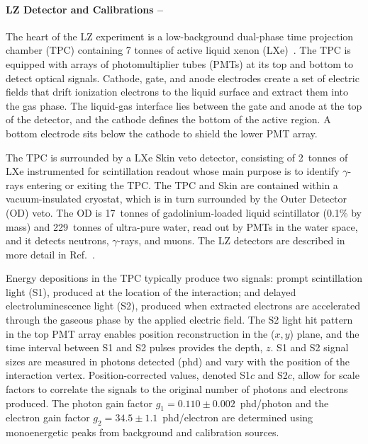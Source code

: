 \paragraph{LZ Detector and Calibrations --}
The heart of the LZ experiment is a low-background dual-phase time projection chamber (TPC) containing 7 tonnes of active liquid xenon (LXe)~\cite{LZ:Experiment_2020, LZ:TDR_2017}.
The TPC is equipped with arrays of photomultiplier tubes (PMTs) at its top and bottom to detect optical signals.
Cathode, gate, and anode electrodes create a set of electric fields that drift ionization electrons to the liquid surface and extract them into the gas phase.
The liquid-gas interface lies between the gate and anode at the top of the detector, and the cathode defines the bottom of the active region. A bottom electrode sits below the cathode to shield the lower PMT array.

The TPC  is surrounded by a LXe Skin veto detector, consisting of 2~tonnes of LXe instrumented for scintillation readout whose main purpose is to identify $\gamma$-rays  entering or exiting the TPC.
The TPC and Skin are contained within a vacuum-insulated cryostat, which is in turn surrounded by the Outer Detector (OD) veto. The OD is 17~tonnes of gadolinium-loaded liquid scintillator (0.1\% by mass) and 229~tonnes of ultra-pure water, read out by PMTs in the water space, and it detects neutrons, $\gamma$-rays, and muons.
The LZ detectors are described in more detail in Ref.~\cite{LZ:Experiment_2020}.

Energy depositions in the TPC typically produce two signals: prompt scintillation light (S1), produced at the location of the interaction; and delayed electroluminescence light (S2), produced when extracted electrons are accelerated through the gaseous phase by the applied electric field.
The S2 light hit pattern in the top PMT array enables position reconstruction in the ($x,y$) plane, and the time interval between S1 and S2 pulses provides the depth, $z$. S1 and S2 signal sizes are measured in photons detected (phd) and vary with the position of the interaction vertex. Position-corrected values, denoted S1$c$ and S2$c$, allow for scale factors to correlate the signals to the original number of photons and electrons produced.
The photon gain factor $g_1=0.110\pm0.002$~phd/photon and the electron gain factor $g_2=34.5\pm1.1$~phd/electron are determined using monoenergetic peaks from background and calibration sources.

